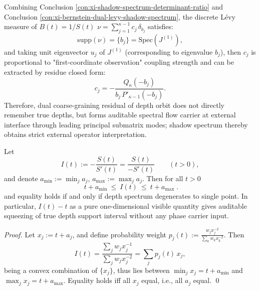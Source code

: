 \begin{proposition}\label{con:xi-shadow-spectrum-operator-meaning}
Combining Conclusion \ref{con:xi-shadow-spectrum-determinant-ratio} and Conclusion \ref{con:xi-bernstein-dual-levy-shadow-spectrum}, the discrete Lévy measure of \(B(t)=1/S(t)\)
\(
\nu=\sum_{j=1}^{\kappa-1}c_j\,\delta_{b_j}
\)
satisfies:
\[
\mathrm{supp}(\nu)=\{b_j\}=\mathrm{Spec}(J^{(1)}),
\]
and taking unit eigenvector \(u_j\) of \(J^{(1)}\) (corresponding to eigenvalue \(b_j\)), then \(c_j\) is proportional to "first-coordinate observation" coupling strength and can be extracted by residue closed form:
\[
c_j=-\frac{Q_{\kappa}(-b_j)}{b_j\,P'_{\kappa-1}(-b_j)}.
\]
Therefore, dual coarse-graining residual of depth orbit does not directly remember true depths, but forms auditable spectral flow carrier at external interface through leading principal submatrix modes; shadow spectrum thereby obtains strict external operator interpretation.
\end{proposition}

\begin{proposition}[Support Squeezing: \texorpdfstring{$I(t)=-S(t)/S'(t)$}{I(t)} Squeezes Depth Interval at Every Scale]\label{con:xi-support-squeeze-I}
Let
\[
I(t):=-\frac{S(t)}{S'(t)}=\frac{S(t)}{-S'(t)}\qquad (t>0),
\]
and denote \(a_{\min}:=\min_j a_j\), \(a_{\max}:=\max_j a_j\).
Then for all \(t>0\)
\[
\boxed{\;
t+a_{\min}\ \le\ I(t)\ \le\ t+a_{\max}\; }.
\]
and equality holds if and only if depth spectrum degenerates to single point.
In particular, \(I(t)-t\) as a pure one-dimensional visible quantity gives auditable squeezing of true depth support interval without any phase carrier input.
\end{proposition}
\begin{proof}
Let \(x_j:=t+a_j\), and define probability weight
\(
p_j(t):=\frac{w_j x_j^{-2}}{\sum_{k}w_k x_k^{-2}}
\).
Then
\[
I(t)=\frac{\sum_j w_j x_j^{-1}}{\sum_j w_j x_j^{-2}}
=\sum_{j}p_j(t)\,x_j,
\]
being a convex combination of \(\{x_j\}\), thus lies between \(\min_j x_j=t+a_{\min}\) and \(\max_j x_j=t+a_{\max}\).
Equality holds iff all \(x_j\) equal, i.e., all \(a_j\) equal. \qed
\end{proof}

\endinput
